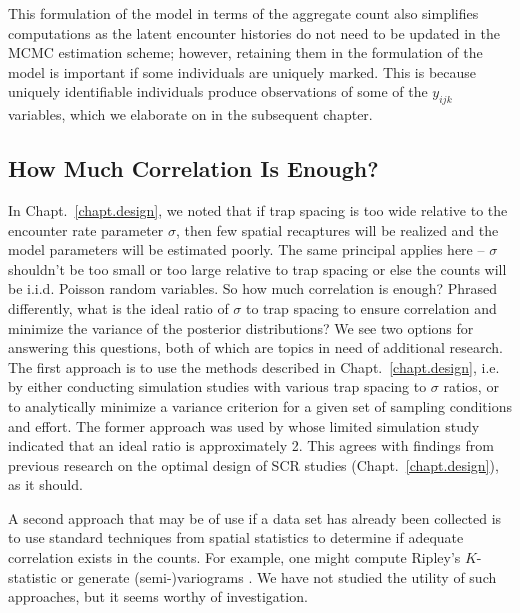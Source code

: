 This formulation of the model in terms of the aggregate count also
simplifies computations as the latent encounter histories
do not need to be updated in the MCMC estimation
scheme; however, retaining them in the formulation of the model
is important if some individuals are uniquely marked. %
This is because
uniquely identifiable individuals produce
observations of some of the $y_{ijk}$ variables, which we elaborate
on in the subsequent chapter.




\subsection{How Much Correlation Is Enough?}
In Chapt.~\ref{chapt.design}, we noted that if trap spacing is too
wide relative to the encounter rate parameter $\sigma$, then few
spatial recaptures will be realized and the model parameters will be
estimated poorly. The same principal applies here --
$\sigma$ shouldn't be too small or too large relative to trap
spacing or else the counts will be i.i.d. Poisson random variables. So
how much correlation is enough? Phrased differently, what is the ideal
ratio of $\sigma$ to trap spacing to ensure correlation and minimize
the variance of the posterior distributions? We see two options for
answering this questions, both of which are topics in need of
additional research. The first approach is to use the methods
described in Chapt.~\ref{chapt.design}, i.e. by either conducting
simulation studies with various trap spacing to $\sigma$ ratios, or to
analytically minimize a variance criterion for a given set of
sampling conditions and effort. The former approach was used by
\citet{chandler_royle:2012} whose limited simulation study indicated
that an ideal ratio is approximately 2. This agrees with
findings from previous research on the optimal design of SCR studies
(Chapt.~\ref{chapt.design}), as it should.

A second approach that may be of use if a data set has already been
collected is to use standard techniques from spatial statistics to
determine if adequate correlation exists in the counts. For example,
one might compute Ripley's $K$-statistic or generate (semi-)variograms
\citep{illian_etal:2008}. We have not studied the utility of such
approaches, but it seems worthy of investigation.



